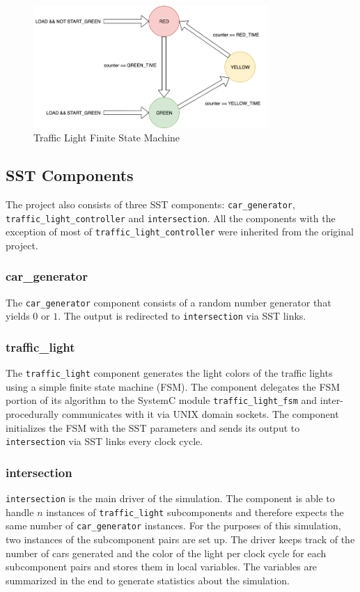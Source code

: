 \documentclass{article}
\begin{document}
    \begin{figure}[!h]
      \centering
      \includegraphics[width=3.5in]{diagrams/fsm.png}
      \caption{Traffic Light Finite State Machine}
      \label{fig:fsm}
    \end{figure}

    \subsection{SST Components}
    The project also consists of three SST components: \lstinline{car_generator},
    \lstinline{traffic_light_controller} and \lstinline{intersection}. All the components with the
    exception of most of \lstinline{traffic_light_controller} were inherited from the original
    project.

      \subsubsection{car\_generator}
      The \lstinline{car_generator} component consists of a random number generator that yields $0$
      or $1$. The output is redirected to \lstinline{intersection} via SST links.

      \subsubsection{traffic\_light}

      The \lstinline{traffic_light} component generates the light colors of the traffic lights using
      a simple finite state machine (FSM). The component delegates the FSM portion of its algorithm
      to the SystemC module \lstinline{traffic_light_fsm} and inter-procedurally communicates with
      it via UNIX domain sockets. The component initializes the FSM with the SST parameters and
      sends its output to \lstinline{intersection} via SST links every clock cycle.

      \subsubsection{intersection}
      \lstinline{intersection} is the main driver of the simulation. The component is able to handle
      $n$ instances of \lstinline{traffic_light} subcomponents and therefore expects the same number
      of \lstinline{car_generator} instances. For the purposes of this simulation, two instances of
      the subcomponent pairs are set up. The driver keeps track of the number of cars generated and
      the color of the light per clock cycle for each subcomponent pairs and stores them in local
      variables. The variables are summarized in the end to generate statistics about the
      simulation.
\end{document}
